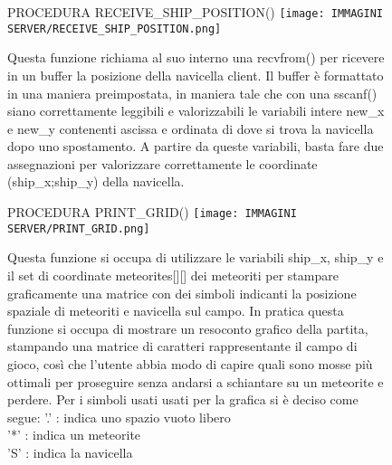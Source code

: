 \documentclass{article}
\begin{document}
\begin{enumerate}
    \begin{figure}[!htb]
    \item PROCEDURA RECEIVE\_SHIP\_POSITION()
        \centering
        \texttt{[image: IMMAGINI SERVER/RECEIVE\_SHIP\_POSITION.png]}
        \raggedright\par
        Questa funzione richiama al suo interno una recvfrom() per ricevere in un buffer la posizione della navicella client. \newline
        Il buffer è formattato in una maniera preimpostata, in maniera tale che con una sscanf() siano correttamente leggibili e valorizzabili le variabili intere new\_x e new\_y contenenti ascissa e ordinata di dove si trova la navicella dopo uno spostamento.
        A partire da queste variabili, basta fare due assegnazioni per valorizzare correttamente le coordinate (ship\_x;ship\_y) della navicella.
    \end{figure}

    \begin{figure}[!htb]
    \item PROCEDURA PRINT\_GRID()
        \centering
        \texttt{[image: IMMAGINI SERVER/PRINT\_GRID.png]}
        \raggedright\par
Questa funzione si occupa di utilizzare le variabili ship\_x, ship\_y e il set di coordinate meteorites[][] dei meteoriti per stampare graficamente una matrice con dei simboli indicanti la posizione spaziale di meteoriti e navicella sul campo. \newline
In pratica questa funzione si occupa di mostrare un resoconto grafico della partita, stampando una matrice di caratteri rappresentante il campo di gioco, così che l'utente abbia modo di capire quali sono mosse più ottimali per proseguire senza andarsi a schiantare su un meteorite e perdere. \newline Per i simboli usati usati per la grafica si è deciso come segue: \newline
        '.' : indica uno spazio vuoto libero\\
        '*' : indica un meteorite\\
        'S' : indica la navicella\\
    \end{figure}


\end{enumerate}
\end{document}
